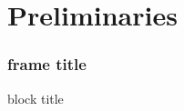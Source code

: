 \section{Preliminaries}

\begin{frame}
    \frametitle{frame title}
    \begin{block}{block title}
    \end{block}
\end{frame}